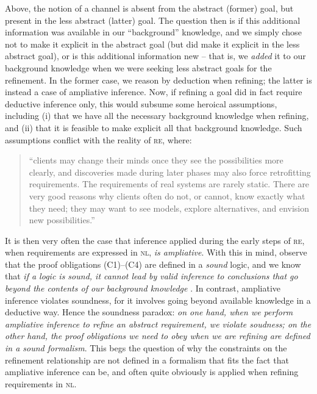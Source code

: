 \documentclass[10pt, conference, compsocconf]{IEEEtran}
\begin{document}
Above, the notion of a channel is absent from the abstract (former) goal, but present in the less abstract (latter) goal. The question then is if this additional information was available in our ``background'' knowledge, and we simply chose not to make it explicit in the abstract goal (but did make it explicit in the less abstract goal), or is this additional information new -- that is, we \textit{added} it to our background knowledge when we were seeking less abstract goals for the refinement. In the former case, we reason by deduction when refining; the latter is instead a case of ampliative inference. Now, if refining a goal did in fact require deductive inference only, this would subsume some heroical assumptions, including (i) that we have all the necessary background knowledge when refining, and (ii) that it is feasible to make explicit all that background knowledge. Such assumptions conflict with the reality of \textsc{re}, where:

\begin{quote}
``clients may change their minds once they see the possibilities more clearly, and discoveries made during later phases may also force retrofitting requirements. The requirements of real systems are rarely static. There are very good reasons why clients often do not, or cannot, know exactly what they need; they may want to see models, explore alternatives, and envision new possibilities.'' \cite{Goguen+:1993:RE}
\end{quote}

It is then very often the case that inference applied during the early steps of \textsc{re}, when requirements are expressed in \textsc{nl}, \textit{is ampliative}. With this in mind, observe that the proof obligations (C1)--(C4) are defined in a \textit{sound} logic, and we know that \textit{if a logic is sound, it cannot lead by valid inference to conclusions that go beyond the contents of our background knowledge} \cite{Kyburg:2001:MM}. In contrast, ampliative inference violates soundness, for it involves going beyond available knowledge in a deductive way. Hence the soundness paradox: \textit{on one hand, when we perform ampliative inference to refine an abstract requirement, we violate soudness; on the other hand, the proof obligations we need to obey when we are refining are defined in a sound formalism}. This begs the question of why the constraints on the refinement relationship are not defined in a formalism that fits the fact that ampliative inference can be, and often quite obviously is applied when refining requirements in \textsc{nl}. 
\end{document}
